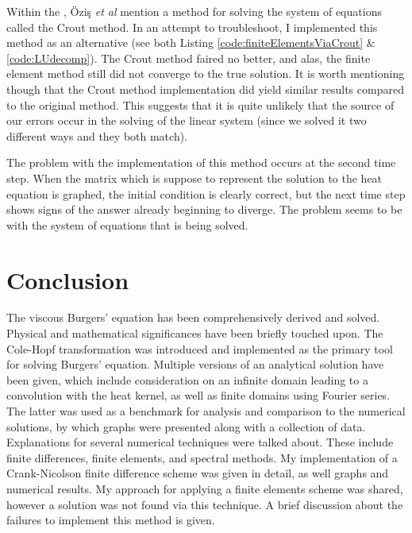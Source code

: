 \documentclass[undefended]{sfuthesis}
\begin{document}
Within the \cite{burgerFiniteElement}, \"Ozi\c{s} \textit{et al} mention a method for solving the system of equations called the Crout method. In an attempt to troubleshoot, I implemented this method as an alternative (see both Listing \ref{code:finiteElementsViaCrout} \& \ref{code:LUdecomp}). The Crout method faired no better, and alas, the finite element method still did not converge to the true solution. It is worth mentioning though that the Crout method implementation did yield similar results compared to the original method. This suggests that it is quite unlikely that the source of our errors occur in the solving of the linear system (since we solved it two different ways and they both match).

The problem with the implementation of this method occurs at the second time step. When the matrix which is suppose to represent the solution to the heat equation is graphed, the initial condition is clearly correct, but the next time step shows signs of the answer already beginning to diverge. The problem seems to be with the system of equations that is being solved.

\chapter{Conclusion}
\label{sec:conclusions}

The viscous Burgers' equation has been comprehensively derived and solved. Physical and mathematical significances have been briefly touched upon. The Cole-Hopf transformation was introduced and implemented as the primary tool for solving Burgers' equation. Multiple versions of an analytical solution have been given, which include consideration on an infinite domain leading to a convolution with the heat kernel, as well as finite domains using Fourier series. The latter was used as a benchmark for analysis and comparison to the numerical solutions, by which graphs were presented along with a collection of data. Explanations for several numerical techniques were talked about. These include finite differences, finite elements, and spectral methods. My implementation of a Crank-Nicolson finite difference scheme was given in detail, as well graphs and numerical results. My approach for applying a finite elements scheme was shared, however a solution was not found via this technique. A brief discussion about the failures to implement this method is given.
\end{document}
